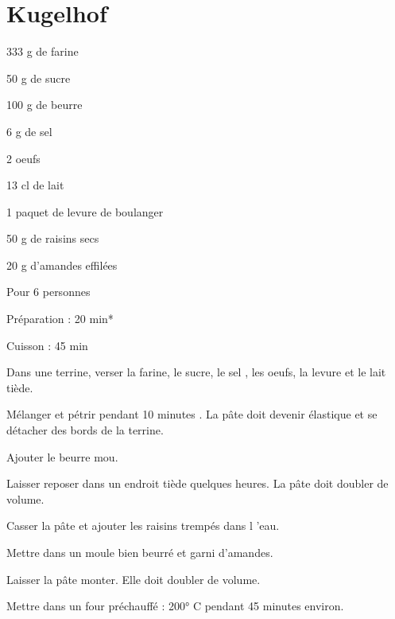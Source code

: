 \section[\normalsize{Kugelhof}]{Kugelhof}

\begin{ingredients}
\item 333 g de farine
\item 50 g de sucre
\item 100 g de beurre
\item 6 g de sel
\item 2 oeufs
\item 13 cl de lait
\item 1 paquet de levure de boulanger
\item 50 g  de raisins secs
\item 20 g d’amandes effil\'ees 
\end{ingredients}
\begin{infos}
\item Pour 6 personnes
\item Préparation : 20 min*
\item Cuisson : 45 min
\end{infos}
\begin{etapes}
\item Dans une terrine, verser la farine, le sucre, le sel , les oeufs, la levure et le lait ti\`ede. 
\item M\'elanger et p\'etrir pendant 10 minutes . La p\^ate doit devenir \'elastique et se d\'etacher des bords de la terrine. 
\item Ajouter le beurre mou.
\item Laisser reposer dans un endroit ti\`ede quelques heures. La p\^ate doit doubler de volume. 
\item Casser la p\^ate et ajouter les raisins tremp\'es dans l ’eau.
\item Mettre dans un moule bien beurr\'e et garni d’amandes.
\item Laisser la p\^ate monter. Elle doit doubler de volume.
\item Mettre dans un four pr\'echauff\'e : 200° C pendant 45 minutes environ.
\end{etapes}
\begin{conseils}
\end{conseils}

